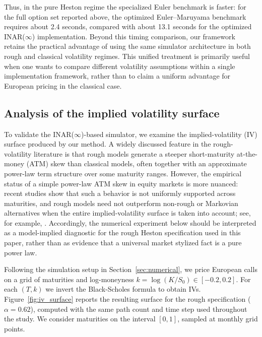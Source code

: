 \documentclass[letterpaper]{article}
\numberwithin{equation}{section}
\theoremstyle{definition}
\theoremstyle{remark}
\begin{document}
Thus, in the pure Heston regime the specialized Euler benchmark is faster: for the full option set reported above, the optimized Euler--Maruyama benchmark requires about 2.4 seconds, compared with about 13.1 seconds for the optimized INAR($\infty$) implementation. Beyond this timing comparison, our framework retains the practical advantage of using the same simulator architecture in both rough and classical volatility regimes. This unified treatment is primarily useful when one wants to compare different volatility assumptions within a single implementation framework, rather than to claim a uniform advantage for European pricing in the classical case.


\subsection{Analysis of the implied volatility surface}

To validate the INAR($\infty$)-based simulator, we examine the implied-volatility (IV) surface produced by our method. A widely discussed feature in the rough-volatility literature is that rough models generate a steeper short-maturity at-the-money (ATM) skew than classical models, often together with an approximate power-law term structure over some maturity ranges. However, the empirical status of a simple power-law ATM skew in equity markets is more nuanced: recent studies show that such a behavior is not uniformly supported across maturities, and rough models need not outperform non-rough or Markovian alternatives when the entire implied-volatility surface is taken into account; see, for example, \cite{guyon2022does,abi2025volatility}. Accordingly, the numerical experiment below should be interpreted as a model-implied diagnostic for the rough Heston specification used in this paper, rather than as evidence that a universal market stylized fact is a pure power law.

Following the simulation setup in Section~\ref{sec:numerical}, we price European calls on a grid of maturities and log-moneyness $k=\log(K/S_0)\in[-0.2,0.2]$. For each $(T,k)$ we invert the Black-Scholes formula to obtain IVs. Figure~\ref{fig:iv_surface} reports the resulting surface for the rough specification ($\alpha=0.62$), computed with the same path count and time step used throughout the study. We consider maturities on the interval $[0,1]$, sampled at monthly grid points.
\end{document}
